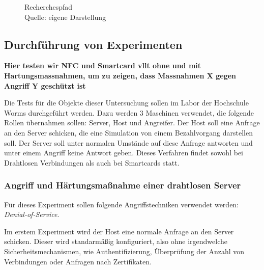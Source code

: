 \begin{landscape}
  \thispagestyle{mylandscape}
  \begin{figure}[h]  
  \centering
         \caption{Recherchespfad\\ Quelle: eigene Darstellung}
          \label{fig:diagramfrage}
  \end{figure}
\end{landscape}


\subsection{Durchführung von Experimenten}
\textbf{Hier testen wir NFC und Smartcard vllt ohne und mit Hartungsmassnahmen, um zu zeigen, dass Massnahmen X gegen
Angriff Y geschützt ist}

Die Tests für die Objekte dieser Untersuchung sollen im Labor der Hochschule Worms durchgeführt werden. 
Dazu werden 3 Maschinen verwendet, die folgende Rollen übernahmen sollen: Server, Host und Angreifer. 
Der Host soll eine Anfrage an den Server schicken, die eine Simulation von einem Bezahlvorgang darstellen soll.
Der Server soll unter normalen Umstände auf diese Anfrage antworten und unter einem Angriff keine Antwort
geben. Dieses Verfahren findet sowohl bei Drahtlosen Verbindungen als auch bei Smartcards statt.


\subsubsection{Angriff und Härtungsmaßnahme einer drahtlosen Server}
Für dieses Experiment sollen folgende Angriffstechniken verwendet werden: \textit{Denial-of-Service}.

Im erstem Experiment wird der Host eine normale Anfrage an den Server schicken. Dieser wird standarmäßig konfiguriert,
also ohne irgendwelche Sicherheitsmechanismen, wie Authentifizierung, Überprüfung der Anzahl von Verbindungen oder Anfragen
nach Zertifikaten.

